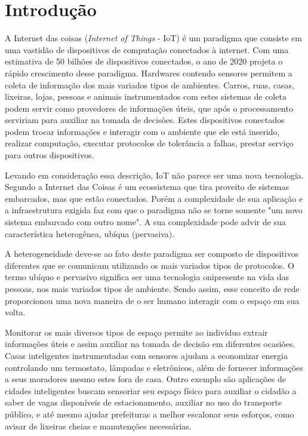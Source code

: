\documentclass[
    hidelinks,
	12pt,				%
	openany,
	oneside, 
	a4paper,			%
	english,			%
	french,				%
	spanish,			%
	brazil				%
	]{abntex2}
\begin{document}
\section{Introdução}

A Internet das coisas (\textit{Internet of Things} - IoT) é um paradigma que consiste em uma vastidão de dispositivos de computação conectados à internet. Com uma estimativa de 50 bilhões de dispositivos conectados, o ano de 2020 projeta o rápido crescimento desse paradigma. Hardwares contendo sensores permitem a coleta de informação dos mais variados tipos de ambientes. Carros, ruas, casas, lixeiras, lojas, pessoas e animais instrumentados com estes sistemas de coleta podem servir como provedores de informações úteis, que após o processamento serviriam para auxiliar na tomada de decisões. Estes dispositivos conectados podem trocar informações e interagir com o ambiente que ele está inserido, realizar computação, executar protocolos de tolerância a falhas, prestar serviço para outros dispositivos. 

Levando em consideração essa descrição, IoT não parece ser uma nova tecnologia. Segundo \cite{ray2016introIoT} a Internet das Coisas é um ecossistema que tira proveito de sistemas embarcados, mas que estão conectados. Porém a complexidade de sua aplicação e a infraestrutura exigida faz com que o paradigma não se torne somente "um novo sistema embarcado com outro nome". A sua complexidade pode advir de sua característica heterogênea, ubíqua (pervasiva).

A heterogeneidade deve-se ao fato deste paradigma ser composto de dispositivos diferentes que se comunicam utilizando os mais variados tipos de protocolos. O termo ubíquo e pervasivo significa ser uma tecnologia onipresente na vida das pessoas, nos mais variados tipos de ambiente. Sendo assim, esse conceito de rede proporcionou uma nova maneira de o ser humano interagir com o espaço em sua volta.

Monitorar os mais diversos tipos de espaço permite ao indivíduo extrair informações úteis e assim auxiliar na tomada de decisão em diferentes ocasiões. Casas inteligentes instrumentadas com  sensores ajudam a economizar energia controlando um termostato, lâmpadas e eletrônicos, além de fornecer informações a seus moradores mesmo estes fora de casa. Outro exemplo são aplicações de cidades inteligentes buscam sensoriar seu espaço físico para auxiliar o cidadão a saber de vagas disponíveis de estacionamento, auxiliar no uso do transporte público, e até mesmo ajudar prefeituras a melhor escalonar seus esforços, como avisar de lixeiras cheias e manutenções necessárias. 
\end{document}
